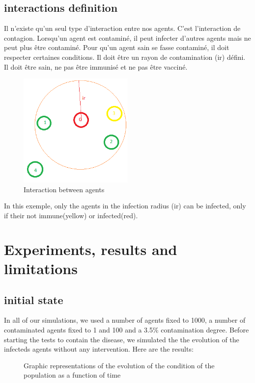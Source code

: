 \documentclass[a4paper, 12pt]{report}
\begin{document}
\subsection{interactions definition}

Il n'existe qu'un seul type d'interaction entre nos agents. C'est l'interaction de contagion. Lorsqu'un agent est contaminé, il peut infecter d'autres agents mais ne peut plus être contaminé. Pour qu'un agent sain se fasse contaminé, il doit respecter certaines conditions. Il doit être un rayon de contamination (ir) défini. Il doit être sain, ne pas être immunisé et ne pas être vacciné.

\begin{figure}[h]
	\centering
	\includegraphics[width=0.5\textwidth]{./Interactions.png}
	\caption{Interaction between agents}
\end{figure}

In this exemple, only the agents in the infection radius (ir) can be infected, only if their not immune(yellow) or infected(red).

\newpage


\section{Experiments, results and limitations}
\subsection{initial state}

In all of our simulations, we used a number of agents fixed to 1000, a number of contaminated agents fixed to 1 and 100 and a 3.5\% contamination degree.
Before starting the tests to contain the disease, we simulated the the evolution of the infecteds agents without any intervention.
Here are the results:

\begin{figure}[h]

	\centering
	\qquad
	\centering
	\caption{Graphic representations of the evolution of the condition of the population as a function of time}

\end{figure}
\end{document}
